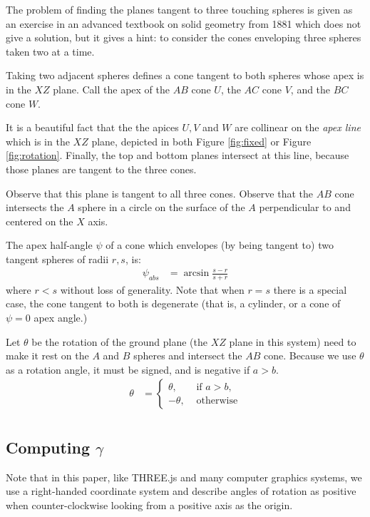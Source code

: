 \documentclass{article}
\begin{document}
The problem of finding the planes tangent to three touching spheres
is given as an exercise in an advanced textbook on solid geometry from 1881\cite{payne1881} which does not give a solution,
but it gives a hint: to consider the cones enveloping
three spheres taken two at a time.

Taking two adjacent spheres defines a cone tangent to both spheres whose apex is in the $XZ$ plane.
Call the apex of the $AB$ cone $U$, the $AC$ cone $V$, and the $BC$ cone $W$.

It is a beautiful fact that the the apices $U,V$ and $W$ are collinear
on the {\em apex line} which is in the $XZ$ plane, depicted in both Figure \ref{fig:fixed}
or Figure \ref{fig:rotation}.
Finally, the top and bottom planes
intersect at this line, because those planes are tangent to the three cones.

Observe that this plane is tangent to all three cones.
Observe that the $AB$ cone intersects
the $A$ sphere in a circle on the surface of the $A$ perpendicular to and centered on the $X$ axis.

The apex half-angle $\psi$ of a cone which envelopes (by being tangent to) two tangent
spheres of radii $r,s$, is:
\begin{align}
 \psi_{abs} &= \arcsin{\frac{s - r}{s + r}}
\end{align}
where $r < s$ without loss of generality. Note that when $r = s$
there is a special case,
the cone tangent to both is degenerate (that is, a cylinder, or a cone of
$\psi = 0$ apex angle.)

Let $\theta$ be the rotation of the ground plane (the $XZ$ plane in this system) need to make
it rest on the $A$ and $B$ spheres and intersect the $AB$ cone.
Because we use $\theta$ as a rotation angle, it must be signed, and is
negative if $a > b$.
\begin{align}
  \theta &= \begin{cases}
    \theta, & \text{ if $a > b$, } \\
    -\theta, & \text{  otherwise}
\end{cases} \label{eq:theta} \\
\end{align}

\subsection{Computing $\gamma$}

Note that in this paper, like THREE.js and many computer graphics systems,
we use a right-handed coordinate system and describe angles of rotation as
positive when counter-clockwise looking from a positive axis as the origin.
\end{document}
